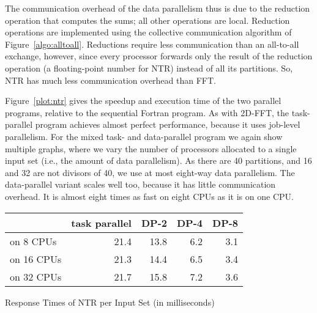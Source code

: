 \documentclass{acmtrans2e}
\begin{document}
The communication overhead of the data parallelism thus is
due to the reduction operation that computes the sums; all other operations
are local. Reduction operations are implemented using the collective
communication algorithm of Figure~\ref{algo:alltoall}. Reductions
require less communication than an all-to-all exchange, however, since
every processor forwards only the result of the reduction operation
(a floating-point number for NTR) instead of all its partitions.
So, NTR has much less communication overhead than FFT.

Figure~\ref{plot:ntr} gives the speedup and execution time
of the two parallel programs, relative to the sequential Fortran program.
As with 2D-FFT, the task-parallel program achieves almost perfect performance,
because it uses job-level parallelism.
For the mixed task- and data-parallel program we again show multiple graphs,
where we vary the number of processors allocated to a single input set
(i.e., the amount of data parallelism).
As there are 40 partitions, and 16 and 32 are not divisors of 40,
we use at most eight-way data parallelism.
The data-parallel variant scales
well too, because it has little communication overhead.
It is almost eight times as fast on eight CPUs as it is on one CPU.


\begin{acmtable}{10cm}
\centering
\begin{tabular*}{10cm}{@{\extracolsep\fill}l|r r r r }
          & task parallel & DP-2 & DP-4 & DP-8 \\
\hline
on 8 CPUs & 21.4 & 13.8 & 6.2 & 3.1 \\
on 16 CPUs & 21.3 & 14.4 & 6.5 & 3.4 \\
on 32 CPUs & 21.7 & 15.8 & 7.2 & 3.6 \\
\end{tabular*}
\caption{Response Times of NTR per Input Set (in milliseconds)}
\label{tab:ntrrpf}
\end{acmtable}
\end{document}
